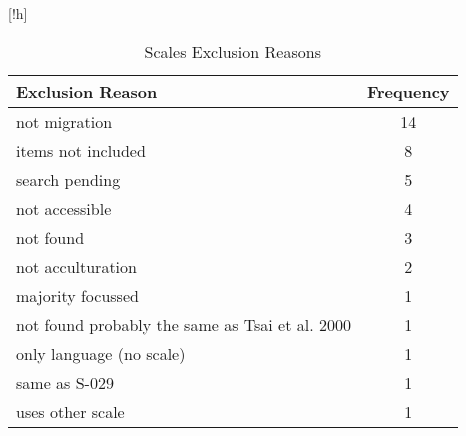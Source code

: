 \begin{table}
\begin{minipage}[t][\textheight][t]{\textwidth}[!h]

\caption{\label{tab:ScalesExclusion}Scales Exclusion Reasons}
\begin{tabular}[t]{lc}
\toprule
Exclusion Reason & Frequency\\
\midrule
not migration & 14\\
items not included & 8\\
search pending & 5\\
not accessible & 4\\
not found & 3\\
not acculturation & 2\\
majority focussed & 1\\
not found probably the same as Tsai et al. 2000 & 1\\
only language (no scale) & 1\\
same as S-029 & 1\\
uses other scale & 1\\
\bottomrule
\end{tabular}
\end{minipage}
\end{table}

